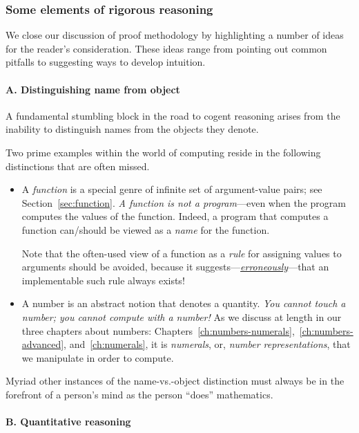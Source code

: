 \subsubsection{Some elements of rigorous reasoning}
\label{sec:elements-of-reasoning}

We close our discussion of proof methodology by highlighting a number
of ideas for the reader's consideration.  These ideas range from
pointing out common pitfalls to suggesting ways to develop intuition.

\medskip

\paragraph{A. Distinguishing name from object}

A fundamental stumbling block in the road to cogent reasoning arises
from the inability to distinguish names from the objects they denote.

Two prime examples within the world of computing reside in the
following distinctions that are often missed.
\begin{itemize}
\item
A {\it function} is a special genre of infinite set of argument-value
pairs; see Section~\ref{sec:function}.  {\em A function is not a
  program}---even when the program computes the values of the
function.  Indeed, a program that computes a function can/should be
viewed as a {\it name} for the function.

Note that the often-used view of a function as a {\em rule} for
assigning values to arguments should be avoided, because it
suggests---\underline{\em erroneously}---that an implementable such
rule always exists!

\item
A number is an abstract notion that denotes a quantity.  {\em You
  cannot touch a number; you cannot compute with a number!}  As we
discuss at length in our three chapters about numbers:
Chapters~\ref{ch:numbers-numerals},~\ref{ch:numbers-advanced},
and~\ref{ch:numerals}, it is {\em numerals}, or, {\em number
  representations}, that we manipulate in order to compute.
\end{itemize}
Myriad other instances of the name-vs.-object distinction must always
be in the forefront of a person's mind as the person ``does''
mathematics.

\medskip

\paragraph{B. Quantitative reasoning}

